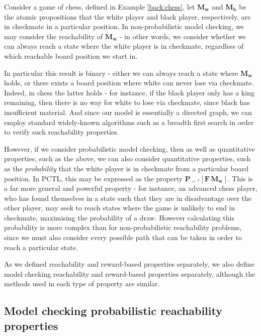 \begin{example}
\label{back:chess-reachability}
    Consider a game of chess, defined in Example \ref{back:chess}, let $\mathbf{M_w}$ and $\mathbf{M_b}$ be the atomic propositions that the white player and black player, respectively, are in checkmate in a particular position. In non-probabilistic model checking, we may consider the reachability of $\mathbf{M_w}$ - in other words, we consider whether we can always reach a state where the white player is in checkmate, regardless of which reachable board position we start in.
    
    In particular this result is binary - either we can always reach a state where $\mathbf{M_w}$ holds, or there exists a board position where white can never lose via checkmate. Indeed, in chess the latter holds - for instance, if the black player only has a king remaining, then there is no way for white to lose via checkmate, since black has insufficient material. And since our model is essentially a directed graph, we can employ standard widely-known algorithms such as a breadth first search in order to verify such reachability properties.

    However, if we consider probabilistic model checking, then as well as quantitative properties, such as the above, we can also consider quantitative properties, such as the \emph{probability} that the white player is in checkmate from a particular board position. In PCTL, this may be expressed as the property $\mathbf{P}_{=?} [\mathbf{F} \, \mathbf{M_w}]$. This is a far more general and powerful property - for instance, an advanced chess player, who has found themselves in a state such that they are in disadvantage over the other player, may seek to reach states where the game is unlikely to end in checkmate, maximising the probability of a draw. However calculating this probability is more complex than for non-probabilistic reachability problems, since we must also consider every possible path that can be taken in order to reach a particular state.

\end{example}

As we defined reachability and reward-based properties separately, we also define model checking reachability and reward-based properties separately, although the methods used in each type of property are similar.

\subsection{Model checking probabilistic reachability properties}
\label{back:check-reach}

